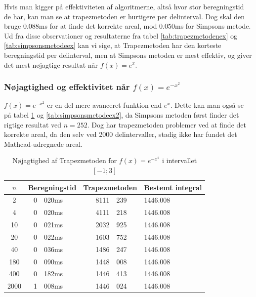 \documentclass[12pt]{article}
\numberwithin{equation}{section}
\begin{document}
Hvis man kigger på effektiviteten af algoritmerne, altså hvor stor beregningstid de har, kan man se at trapezmetoden er hurtigere per delinterval. Dog skal den bruge 0.088ms for at finde det korrekte areal, mod 0.050ms for Simpsons metode.
\\
Ud fra disse observationer og resultaterne fra tabel \ref{tab:trapezmetodenex} og \ref{tab:simpsonsmetodeex} kan vi sige, at Trapezmetoden har den korteste beregningstid per delinterval, men at Simpsons metoden er mest effektiv, og giver det mest nøjagtige resultat når $f(x)=e^x$.

\subsubsection{Nøjagtighed og effektivitet når $f(x)=e^{-x^2}$}
$f(x)=e^{-x^2}$ er en del mere avanceret funktion end $e^x$. Dette kan man også se på tabel \ref{tab:trapezmetodenex2} og \ref{tab:simpsonsmetodeex2}, da Simpsons metoden først finder det rigtige resultat ved $n=252$. Dog har trapezmetoden problemer ved at finde det korrekte areal, da den selv ved 2000 delintervaller, stadig ikke har fundet det Mathcad-udregnede areal.
\begin{table}[H]
	\caption {Nøjagtighed af Trapezmetoden for $f(x)=e^{-x^2}$ i intervallet $[-1;3]$} 
	\label{tab:trapezmetodenex2}
	\begin{center}
		\begin{tabular}{|c|r@{.}l|r @{.} l|l|}
			\hline $n$ & \multicolumn{2}{|c|}{Beregningstid} & \multicolumn{2}{|c|}{Trapezmetoden} & Bestemt integral
			\\
			\hline 2 & 0&020ms & 8111&239 & 1446.008\\ 
			\hline 4 & 0&020ms & 4111&218 & 1446.008\\ 
			\hline 10 & 0&021ms & 2032&925 & 1446.008\\ 
			\hline 20 & 0&022ms & 1603&752 & 1446.008\\ 
			\hline 40 & 0&036ms & 1486&247 & 1446.008\\ 
			\hline 180 & 0&090ms & 1448&008 & 1446.008\\
			\hline 400 & 0&182ms & 1446&413 & 1446.008\\
			\hline 2000 & 1&008ms & 1446&024 & 1446.008\\
			\hline
		\end{tabular}
	\end{center}
\end{table}
\end{document}
